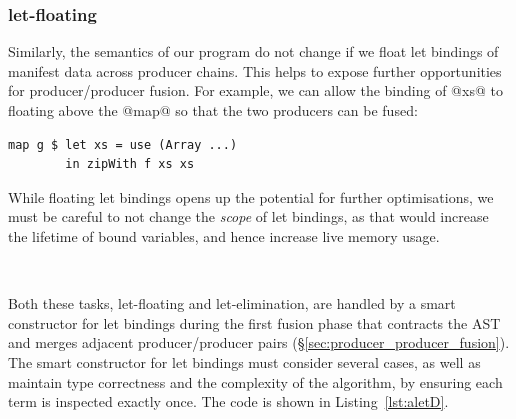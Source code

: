 \subsubsection{let-floating}

Similarly, the semantics of our program do not change if we float let bindings
of manifest data across producer chains. This helps to expose further
opportunities for producer/producer fusion. For example, we can allow the
binding of @xs@ to floating above the @map@ so that the two producers can be
fused:
%
\begin{lstlisting}[style=haskell]
map g $ let xs = use (Array ...)
        in zipWith f xs xs
\end{lstlisting}
%
While floating let bindings opens up the potential for further optimisations, we
must be careful to not change the \emph{scope} of let bindings, as that would
increase the lifetime of bound variables, and hence increase live memory usage.


\par{} %

Both these tasks, let-floating and let-elimination, are handled by a smart
constructor for let bindings during the first fusion phase that contracts the
AST and merges adjacent producer/producer pairs
(\S\ref{sec:producer_producer_fusion}). The smart constructor for let bindings
must consider several cases, as well as maintain type correctness and the
complexity of the algorithm, by ensuring each term is inspected exactly once.
The code is shown in Listing~\ref{lst:aletD}.

